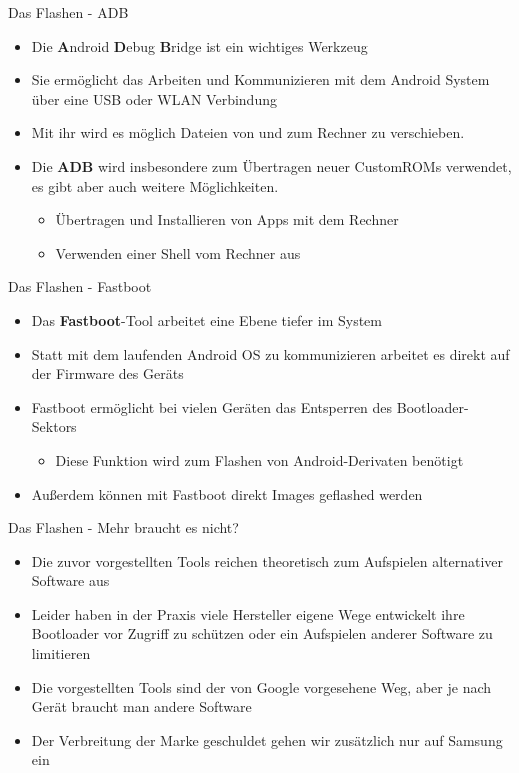 \begin{frame}{Das Flashen - ADB}
	\begin{itemize}[<+->]
		\item Die \textbf{A}ndroid \textbf{D}ebug \textbf{B}ridge ist ein wichtiges Werkzeug
		\item Sie ermöglicht das Arbeiten und Kommunizieren mit dem Android System über eine USB oder WLAN Verbindung
		\item Mit ihr wird es möglich Dateien von und zum Rechner zu verschieben.
		\item Die \textbf{ADB} wird insbesondere zum Übertragen neuer CustomROMs verwendet, es gibt aber auch weitere Möglichkeiten.
		\begin{itemize}[<+->]
			\item Übertragen und Installieren von Apps mit dem Rechner
			\item Verwenden einer Shell vom Rechner aus
		\end{itemize}
	\end{itemize}
\end{frame}

\begin{frame}{Das Flashen - Fastboot}
	\begin{itemize}[<+->]
		\item Das \textbf{Fastboot}-Tool arbeitet eine Ebene tiefer im System
		\item Statt mit dem laufenden Android OS zu kommunizieren arbeitet es direkt auf der Firmware des Geräts
		\item Fastboot ermöglicht bei vielen Geräten das Entsperren des Bootloader-Sektors
		\begin{itemize}[<+->]
			\item Diese Funktion wird zum Flashen von Android-Derivaten benötigt
		\end{itemize}
		\item Außerdem können mit Fastboot direkt Images geflashed werden
	\end{itemize}
\end{frame}

\begin{frame}{Das Flashen - Mehr braucht es nicht?}
	\begin{itemize}
		\item Die zuvor vorgestellten Tools reichen theoretisch zum Aufspielen alternativer Software aus
		\item Leider haben in der Praxis viele Hersteller eigene Wege entwickelt ihre Bootloader vor Zugriff zu schützen oder ein Aufspielen anderer Software zu limitieren
		\item Die vorgestellten Tools sind der von Google vorgesehene Weg, aber je nach Gerät braucht man andere Software
		\item Der Verbreitung der Marke geschuldet gehen wir zusätzlich nur auf Samsung ein
	\end{itemize}
\end{frame}

